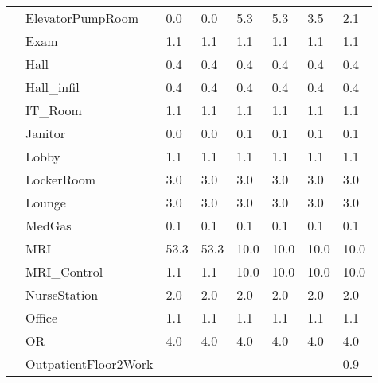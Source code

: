 \begin{center}
\begin{longtable}{p{1.25in}p{1in}p{0.5in}p{0.5in}p{0.5in}p{0.5in}p{0.5in}p{0.5in}}
                                   & ElevatorPumpRoom                     & 0.0     & 0.0     & 5.3    & 5.3   & 3.5   & 2.1    \\
                                   & Exam                                 & 1.1     & 1.1     & 1.1    & 1.1   & 1.1   & 1.1    \\
                                   & Hall                                 & 0.4     & 0.4     & 0.4    & 0.4   & 0.4   & 0.4    \\
                                   & Hall\_infil                          & 0.4     & 0.4     & 0.4    & 0.4   & 0.4   & 0.4    \\
                                   & IT\_Room                             & 1.1     & 1.1     & 1.1    & 1.1   & 1.1   & 1.1    \\
                                   & Janitor                              & 0.0     & 0.0     & 0.1    & 0.1   & 0.1   & 0.1    \\
                                   & Lobby                                & 1.1     & 1.1     & 1.1    & 1.1   & 1.1   & 1.1    \\
                                   & LockerRoom                           & 3.0     & 3.0     & 3.0    & 3.0   & 3.0   & 3.0    \\
                                   & Lounge                               & 3.0     & 3.0     & 3.0    & 3.0   & 3.0   & 3.0    \\
                                   & MedGas                               & 0.1     & 0.1     & 0.1    & 0.1   & 0.1   & 0.1    \\
                                   & MRI                                  & 53.3    & 53.3    & 10.0   & 10.0  & 10.0  & 10.0   \\
                                   & MRI\_Control                         & 1.1     & 1.1     & 10.0   & 10.0  & 10.0  & 10.0   \\
                                   & NurseStation                         & 2.0     & 2.0     & 2.0    & 2.0   & 2.0   & 2.0    \\
                                   & Office                               & 1.1     & 1.1     & 1.1    & 1.1   & 1.1   & 1.1    \\
                                   & OR                                   & 4.0     & 4.0     & 4.0    & 4.0   & 4.0   & 4.0    \\
                                   & OutpatientFloor2Work                 &         &         &        &       &       & 0.9    \\

\end{longtable}
\end{center}
